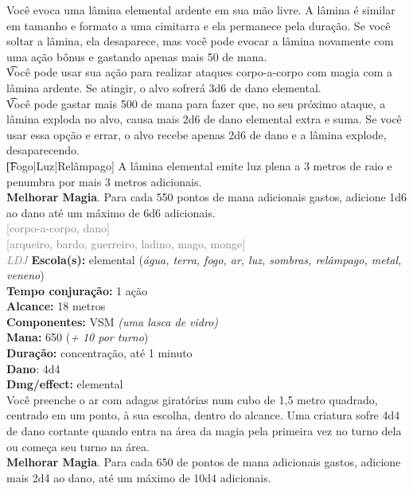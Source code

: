 \documentclass{RPG_Adventure}[2021/10/20]
\begin{document}
{\normalsize Você evoca uma lâmina elemental ardente em sua mão livre. A lâmina é similar em tamanho e formato a uma cimitarra e ela permanece pela duração. Se você soltar a lâmina, ela desaparece, mas você pode evocar a lâmina novamente com uma ação bônus e gastando apenas mais 50 de mana.\\\t Você pode usar sua ação para realizar ataques corpo-a-corpo com magia com a lâmina ardente. Se atingir, o alvo sofrerá 3d6 de dano elemental.\\\t Você pode gastar mais 500 de mana para fazer que, no seu próximo ataque, a lâmina exploda no alvo, causa mais 2d6 de dano elemental extra e suma. Se você usar essa opção e errar, o alvo recebe apenas 2d6 de dano e a lâmina explode, desaparecendo.\\\t [Fogo|Luz|Relâmpago] A lâmina elemental emite luz plena a 3 metros de raio e penumbra por mais 3 metros adicionais.\\\t \textbf{Melhorar Magia}. Para cada 550 pontos de mana adicionais gastos, adicione 1d6 ao dano até um máximo de 6d6 adicionais.\\}
{\scriptsize \textcolor{gray}{[corpo-a-corpo, dano]\\}}
{\scriptsize \textcolor{gray}{[arqueiro, bardo, guerreiro, ladino, mago, monge]\\}}
{\tiny \textcolor{gray}{\textit{LDJ}}}\jump{}
{\small \t \textbf{Escola(s):} elemental (\textit{água, terra, fogo, ar, luz, sombras, relâmpago, metal, veneno})\\\t \textbf{Tempo conjuração:} 1 ação\\\t \textbf{Alcance:} 18 metros\\\t \textbf{Componentes:} VSM \textit{(uma lasca de vidro)}\\\t \textbf{Mana:} 650 (\textit{+ 10 por turno})\\\t \textbf{Duração:} concentração, até 1 minuto\\\t \textbf{Dano}: 4d4\\\t \textbf{Dmg/effect:} elemental\\}
{\normalsize Você preenche o ar com adagas giratórias num cubo de 1,5 metro quadrado, centrado em um ponto, à sua escolha, dentro do alcance. Uma criatura sofre 4d4 de dano cortante quando entra na área da magia pela primeira vez no turno dela ou começa seu turno na área.\\\t \textbf{Melhorar Magia}. Para cada 650 de pontos de mana adicionais gastos, adicione mais 2d4 ao dano, até um máximo de 10d4 adicionais.\\}
\end{document}

